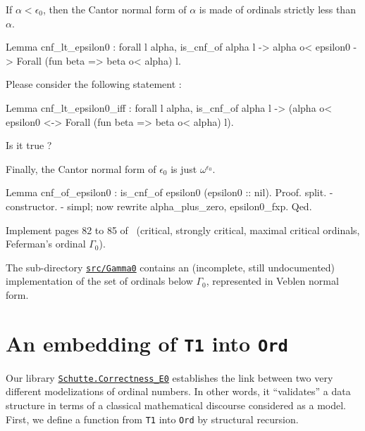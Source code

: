 {If $\alpha<\epsilon_0$, then the Cantor normal form of $\alpha$ is made of ordinals strictly less than $\alpha$.

\begin{Coqsrc}
Lemma cnf_lt_epsilon0 : 
 forall l alpha, 
   is_cnf_of alpha l ->  alpha o< epsilon0 ->
   Forall (fun beta =>  beta o< alpha) l.
\end{Coqsrc}


\begin{exercise}
Please consider the following statement :

\begin{Coqsrc}
Lemma cnf_lt_epsilon0_iff : 
 forall l alpha, 
   is_cnf_of alpha l ->  
   (alpha o< epsilon0 <->  Forall (fun beta =>  beta o< alpha) l).
\end{Coqsrc}

Is it true ?
\end{exercise}

Finally, the Cantor normal form of $\epsilon_0$ is just $\omega^{\epsilon_0}$.

\begin{Coqsrc}
Lemma cnf_of_epsilon0 : is_cnf_of epsilon0 (epsilon0 :: nil).
Proof.
  split.
  - constructor.  
  - simpl;  now rewrite alpha_plus_zero, epsilon0_fxp.
Qed.
\end{Coqsrc}


\begin{project}
Implement pages 82 to 85 of~\cite{schutte} (critical, strongly critical, maximal critical ordinals, Feferman's ordinal $\Gamma_0$).
\end{project}

\begin{remark}
The sub-directory \href{../src/html/hydras.Gamma0.html}%
{\texttt{src/Gamma0}} contains an (incomplete, still undocumented) implementation of the set of ordinals below $\Gamma_0$, represented in Veblen normal form. 
\end{remark}

\section{An embedding of \texttt{T1} into \texttt{Ord}}


Our library 
\href{../src/html/hydras.Schutte.correctness_E0.html}%
{\texttt{Schutte.Correctness\_E0}} establishes the link between two very different modelizations of ordinal numbers. In other words, it ``validates'' a data structure in terms of
a classical mathematical discourse considered as a model. 
First, we define a function from \texttt{T1} into  \texttt{Ord} by structural recursion.

}
